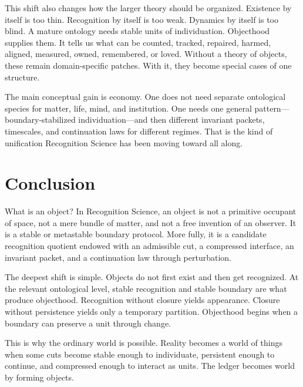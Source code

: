 \documentclass[11pt]{article}
\begin{document}
This shift also changes how the larger theory should be organized.
Existence by itself is too thin.
Recognition by itself is too weak.
Dynamics by itself is too blind.
A mature ontology needs stable units of individuation.
Objecthood supplies them.
It tells us what can be counted, tracked, repaired, harmed, aligned, measured, owned, remembered, or loved.
Without a theory of objects, these remain domain-specific patches.
With it, they become special cases of one structure.

The main conceptual gain is economy.
One does not need separate ontological species for matter, life, mind, and institution.
One needs one general pattern---boundary-stabilized individuation---and then different invariant packets, timescales, and continuation laws for different regimes.
That is the kind of unification Recognition Science has been moving toward all along.

\section{Conclusion}

What is an object?
In Recognition Science, an object is not a primitive occupant of space, not a mere bundle of matter, and not a free invention of an observer.
It is a stable or metastable boundary protocol.
More fully, it is a candidate recognition quotient endowed with an admissible cut, a compressed interface, an invariant packet, and a continuation law through perturbation.

The deepest shift is simple.
Objects do not first exist and then get recognized.
At the relevant ontological level, stable recognition and stable boundary are what produce objecthood.
Recognition without closure yields appearance.
Closure without persistence yields only a temporary partition.
Objecthood begins when a boundary can preserve a unit through change.

This is why the ordinary world is possible.
Reality becomes a world of things when some cuts become stable enough to individuate, persistent enough to continue, and compressed enough to interact as units.
The ledger becomes world by forming objects.
\end{document}
